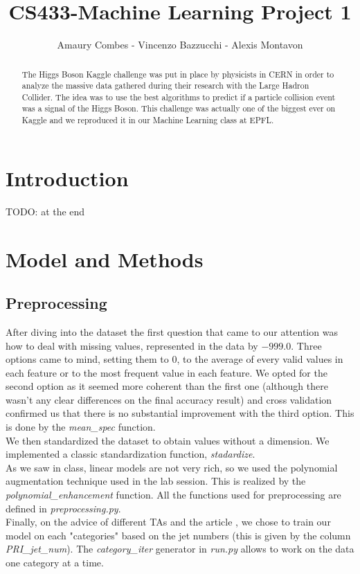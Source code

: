 \documentclass[10pt,conference,compsocconf]{IEEEtran}
\begin{document}
\title{CS433-Machine Learning Project 1}

\author{
  Amaury Combes - Vincenzo Bazzucchi - Alexis Montavon\\
}

\maketitle

\begin{abstract}
  The Higgs Boson Kaggle challenge was put in place by physicists in CERN in order to analyze the massive data gathered during their research with the Large Hadron Collider. The idea was to use the best algorithms to predict if a particle collision event was a signal of the Higgs Boson. This challenge was actually one of the biggest ever on Kaggle and we reproduced it in our Machine Learning class at EPFL.
\end{abstract}

\section{Introduction}

TODO: at the end

\section{Model and Methods}
\label{sec:model}
\subsection{Preprocessing}
After diving into the dataset the first question that came to our attention was how to deal with missing values, represented in the data by $-999.0$. Three options came to mind, setting them to $0$, to the average of every valid values in each feature or to the most frequent value in each feature. We opted for the second option as it seemed more coherent than the first one (although there wasn't any clear differences on the final accuracy result) and cross validation confirmed us that there is no substantial improvement with the third option. This is done by the \textit{mean\_spec} function.\\
We then standardized the dataset to obtain values without a dimension. We implemented a classic standardization function, \textit{stadardize}.\\ As we saw in class, linear models are not very rich, so we used the polynomial augmentation technique used in the lab session. This is realized by the \textit{polynomial\_enhancement} function. All the functions used for preprocessing are defined in \textit{preprocessing.py}.\\
Finally, on the advice of different TAs and the article \cite{anderson04}, we chose to train our model on each "categories" based on the jet numbers (this is given by the column \textit{PRI\_jet\_num}). The \textit{category\_iter} generator in \textit{run.py} allows to work on the data one category at a time.
\end{document}
